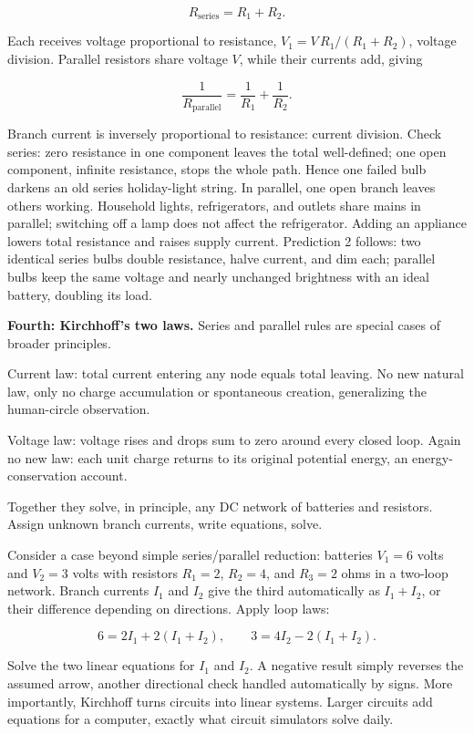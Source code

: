 \[
R_{\text{series}}=R_1+R_2.
\]

Each receives voltage proportional to resistance, \(V_1=V\,R_1/(R_1+R_2)\), voltage division. Parallel resistors share voltage \(V\), while their currents add, giving

\[
\frac{1}{R_{\text{parallel}}}=\frac{1}{R_1}+\frac{1}{R_2}.
\]

Branch current is inversely proportional to resistance: current division. Check series: zero resistance in one component leaves the total well-defined; one open component, infinite resistance, stops the whole path. Hence one failed bulb darkens an old series holiday-light string. In parallel, one open branch leaves others working. Household lights, refrigerators, and outlets share mains in parallel; switching off a lamp does not affect the refrigerator. Adding an appliance lowers total resistance and raises supply current. Prediction 2 follows: two identical series bulbs double resistance, halve current, and dim each; parallel bulbs keep the same voltage and nearly unchanged brightness with an ideal battery, doubling its load.

\textbf{Fourth: Kirchhoff's two laws.} Series and parallel rules are special cases of broader principles.

Current law: total current entering any node equals total leaving. No new natural law, only no charge accumulation or spontaneous creation, generalizing the human-circle observation.

Voltage law: voltage rises and drops sum to zero around every closed loop. Again no new law: each unit charge returns to its original potential energy, an energy-conservation account.

Together they solve, in principle, any DC network of batteries and resistors. Assign unknown branch currents, write equations, solve.

\begin{mathbridge}
Consider a case beyond simple series/parallel reduction: batteries \(V_1=6\) volts and \(V_2=3\) volts with resistors \(R_1=2\), \(R_2=4\), and \(R_3=2\) ohms in a two-loop network. Branch currents \(I_1\) and \(I_2\) give the third automatically as \(I_1+I_2\), or their difference depending on directions. Apply loop laws:

\[
6=2I_1+2(I_1+I_2),\qquad 3=4I_2-2(I_1+I_2).
\]

Solve the two linear equations for \(I_1\) and \(I_2\). A negative result simply reverses the assumed arrow, another directional check handled automatically by signs. More importantly, Kirchhoff turns circuits into linear systems. Larger circuits add equations for a computer, exactly what circuit simulators solve daily.
\end{mathbridge}

